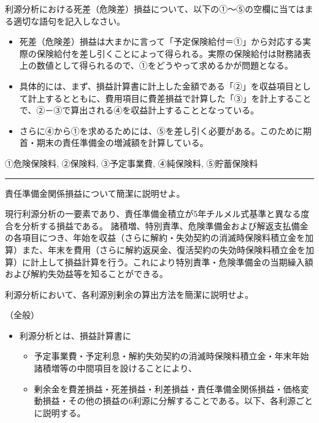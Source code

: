 \documentclass[report,gutter=10mm,fore-edge=10mm,uplatex,dvipdfmx]{jlreq}
\begin{document}

利源分析における死差（危険差）損益について、以下の①～⑤の空欄に当てはまる適切な語句を記入しなさい。
\begin{itemize}
\item 死差（危険差）損益は大まかに言って「予定保険給付＝①」から対応する実際の保険給付を差し引くことによって得られる。実際の保険給付は財務諸表上の数値として得られるので、①をどうやって求めるかが問題となる。
\item 具体的には、まず、損益計算書に計上した金額である「②」を収益項目として計上するとともに、費用項目に費差損益で計算した「③」を計上することで、②－③で算出される④を収益計上することとなっている。
\item さらに④から①を求めるためには、⑤を差し引く必要がある。このために期首・期末の責任準備金の増減額を計算している。
\end{itemize}


①危険保険料, ②保険料, ③予定事業費, ④純保険料, ⑤貯蓄保険料

\begin{center}\rule{0.5\linewidth}{0.5pt}\end{center}


責任準備金関係損益について簡潔に説明せよ。



現行利源分析の一要素であり、責任準備金積立が5年チルメル式基準と異なる度合を分析する損益である。
諸積増、特別責準、危険準備金および解返支払備金の各項目につき、年始を収益（さらに解約・失効契約の消滅時保険料積立金を加算）また、年末を費用（さらに解約返戻金、復活契約の失効時保険料積立金を加算）に計上して損益計算を行う。これにより特別責準・危険準備金の当期繰入額および解約失効益等を知ることができる。


利源分析において、各利源別剰余の算出方法を簡潔に説明せよ。


（全般）

\begin{itemize}
\tightlist
\item
  利源分析とは、損益計算書に

  \begin{itemize}
  \tightlist
  \item
    予定事業費・予定利息・解約失効契約の消滅時保険料積立金・年末年始諸積増等の中間項目を設けることにより、
  \item
    剰余金を費差損益・死差損益・利差損益・責任準備金関係損益・価格変動損益・その他の損益の6利源に分解することである。以下、各利源ごとに説明する。
  \end{itemize}
\end{itemize}
\end{document}
